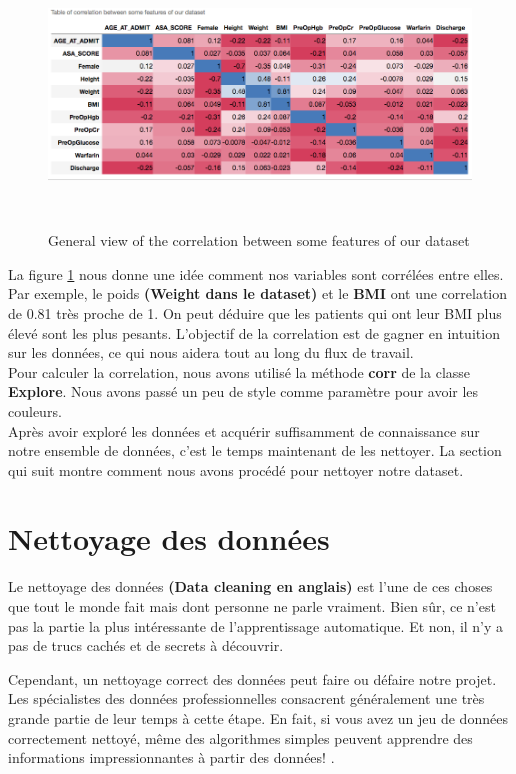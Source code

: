 \documentclass[12pt, french]{report}
\begin{document}
\begin{figure}[h]
\includegraphics[width=17.5cm, height =7cm]{images/correlation.png}
\caption{General view of the correlation between some features of our dataset}
\label{fig:correlation}
\end{figure}

La figure \ref{fig:correlation} nous donne une idée comment nos variables sont corrélées entre elles. Par exemple, le poids \textbf{ (Weight dans le dataset)} et le \textbf{BMI} ont une correlation de 0.81 très proche de 1. On peut déduire que les patients qui ont leur BMI plus élevé sont les plus pesants. L'objectif de la correlation est de gagner en intuition sur les données, ce qui nous aidera tout au long du flux de travail.\\ 

Pour calculer la correlation, nous avons utilisé la méthode \textbf{corr} de  la classe \textbf{Explore}. Nous avons passé un peu de style comme paramètre pour avoir les couleurs.  \\
 
Après avoir exploré les données et acquérir suffisamment de connaissance sur notre ensemble de données, c'est le temps maintenant de les nettoyer. La section qui suit montre comment nous avons procédé pour nettoyer notre dataset.

\section{Nettoyage des données}
Le nettoyage des données \textbf{(Data cleaning en anglais)} est l'une de ces choses que tout le monde fait mais dont personne ne parle vraiment. Bien sûr, ce n'est pas la partie la plus intéressante de l'apprentissage automatique. Et non, il n'y a pas de trucs cachés et de secrets à découvrir.

Cependant, un nettoyage correct des données peut faire ou défaire notre projet. Les spécialistes des données professionnelles consacrent généralement une très grande partie de leur temps à cette étape. En fait, si vous avez un jeu de données correctement nettoyé, même des algorithmes simples peuvent apprendre des informations impressionnantes à partir des données! \cite{key21}.
\end{document}
